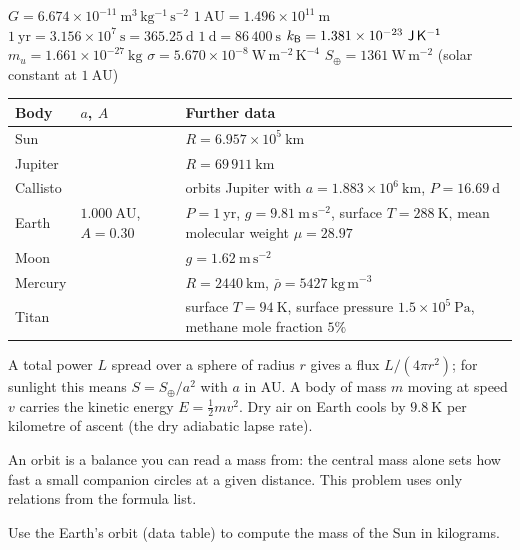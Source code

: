 \begin{given}
$G = 6.674 \times 10^{-11}\ \mathrm{m^3\,kg^{-1}\,s^{-2}}$ \quad
$1\ \mathrm{AU} = 1.496 \times 10^{11}\ \mathrm{m}$ \quad
$1\ \mathrm{yr} = 3.156 \times 10^{7}\ \mathrm{s} = 365.25\ \mathrm{d}$ \quad
$1\ \mathrm{d} = 86\,400\ \mathrm{s}$ \quad
$\kB = 1.381 \times 10^{-23}\ \mathrm{J\,K^{-1}}$ \quad
$m_u = 1.661 \times 10^{-27}\ \mathrm{kg}$ \quad
$\sigma = 5.670 \times 10^{-8}\ \mathrm{W\,m^{-2}\,K^{-4}}$ \quad
$S_\oplus = 1361\ \mathrm{W\,m^{-2}}$ (solar constant at $1\ \mathrm{AU}$)

\vskip6pt
\begin{tabular}{@{}llp{7.2cm}@{}}
\toprule
Body & $a$, $A$ & Further data \\
\midrule
Sun & & $R = 6.957 \times 10^{5}\ \mathrm{km}$ \\
Jupiter & & $R = 69\,911\ \mathrm{km}$ \\
Callisto & & orbits Jupiter with $a = 1.883 \times 10^{6}\ \mathrm{km}$, $P = 16.69\ \mathrm{d}$ \\
Earth & $1.000\ \mathrm{AU}$, $A = 0.30$ & $P = 1\ \mathrm{yr}$, $g = 9.81\ \mathrm{m\,s^{-2}}$, surface $T = 288\ \mathrm{K}$, mean molecular weight $\mu = 28.97$ \\
Moon & & $g = 1.62\ \mathrm{m\,s^{-2}}$ \\
Mercury & & $R = 2440\ \mathrm{km}$, $\bar{\rho} = 5427\ \mathrm{kg\,m^{-3}}$ \\
Titan & & surface $T = 94\ \mathrm{K}$, surface pressure $1.5 \times 10^{5}\ \mathrm{Pa}$, methane mole fraction $5\%$ \\
\bottomrule
\end{tabular}

\vskip4pt
{\footnotesize A total power $L$ spread over a sphere of radius $r$ gives a flux $L/(4\pi r^2)$; for sunlight this means $S = S_\oplus/a^2$ with $a$ in AU.
A body of mass $m$ moving at speed $v$ carries the kinetic energy $E = \tfrac{1}{2} m v^2$.
Dry air on Earth cools by $9.8\ \mathrm{K}$ per kilometre of ascent (the dry adiabatic lapse rate).}
\end{given}



An orbit is a balance you can read a mass from: the central mass alone sets how fast a small companion circles at a given distance.
This problem uses only relations from the formula list.

\parti {} Use the Earth's orbit (data table) to compute the mass of the Sun in kilograms.

